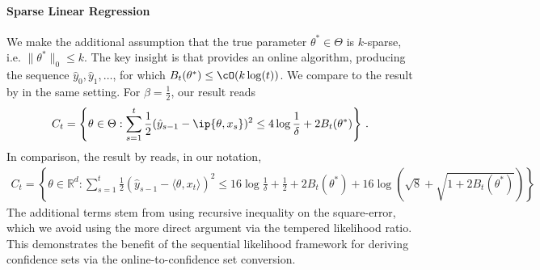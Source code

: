 \paragraph{Sparse Linear Regression} We make the additional assumption that the true parameter $\theta^* \in \Theta$ is $k$-sparse, i.e. $\|\theta^*\|_0 \leq k$. The key insight is that \citet{gerchinovitz2011sparsity} provides an online algorithm, producing the sequence $\hat y_0, \hat y_1, \dots$, for which $B_t(\theta^*) \leq  \cO( k \log(t))$. We compare to the result by \citet{abbasi2012online} in the same setting. For $\beta = \frac{1}{2}$, our result reads
\begin{align*}
   C_t = \left\{ \theta \in \Theta : \sum_{s=1}^t \frac{1}{2} (\hat y_{s-1} - \ip{\theta, x_s})^2 \leq 4\log \frac{1}{\delta} + 2 B_t(\theta^*) \right\} \,.
\end{align*}
In comparison, the result by \citet[Theorem 1]{abbasi2012online} reads, in our notation,
\begin{align*}
C_t = \left\{ \theta \in \mathbb{R}^d : \sum_{s=1}^{t}  \frac{1}{2}(\hat y_{s-1} - \langle \theta, x_t \rangle)^2 \leq 16 \log \frac{1}{\delta} + \frac{1}{2} + 2B_t(\theta^*) + 16\log (\sqrt{8} + \sqrt{1 + 2 B_t(\theta^*)}) \right\}
\end{align*}
The additional terms stem from using recursive inequality on the square-error, which we avoid using the more direct argument via the tempered likelihood ratio. This demonstrates the benefit of the sequential likelihood framework for deriving confidence sets via the online-to-confidence set conversion.
